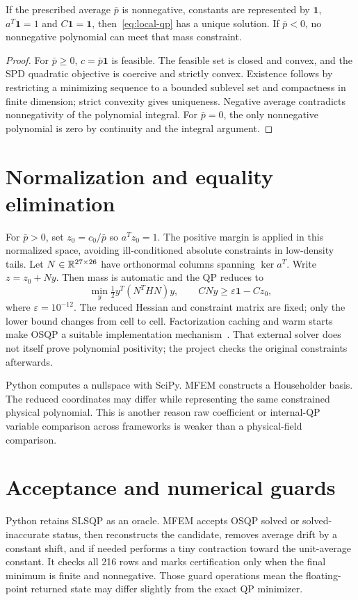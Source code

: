 \begin{proposition}\label{prop:qp}
If the prescribed average $\bar p$ is nonnegative, constants are represented by $\bm1$, $a^T\bm1=1$ and $C\bm1=\bm1$, then~\eqref{eq:local-qp} has a unique solution. If $\bar p<0$, no nonnegative polynomial can meet that mass constraint.
\end{proposition}
\begin{proof}
For $\bar p\ge0$, $c=\bar p\bm1$ is feasible. The feasible set is closed and convex, and the SPD quadratic objective is coercive and strictly convex. Existence follows by restricting a minimizing sequence to a bounded sublevel set and compactness in finite dimension; strict convexity gives uniqueness. Negative average contradicts nonnegativity of the polynomial integral. For $\bar p=0$, the only nonnegative polynomial is zero by continuity and the integral argument.
\end{proof}

\section{Normalization and equality elimination}
For $\bar p>0$, set $z_0=c_0/\bar p$ so $a^Tz_0=1$. The positive margin is applied in this normalized space, avoiding ill-conditioned absolute constraints in low-density tails. Let $N\in\mathbb R^{27\times26}$ have orthonormal columns spanning $\ker a^T$. Write $z=z_0+Ny$. Then mass is automatic and the QP reduces to
\begin{equation}\label{eq:reduced-qp}
\min_y\tfrac12y^T(N^THN)y,\qquad CNy\ge\varepsilon\bm1-Cz_0,
\end{equation}
where $\varepsilon=10^{-12}$. The reduced Hessian and constraint matrix are fixed; only the lower bound changes from cell to cell. Factorization caching and warm starts make OSQP a suitable implementation mechanism~\cite{osqp}. That external solver does not itself prove polynomial positivity; the project checks the original constraints afterwards.

Python computes a nullspace with SciPy. MFEM constructs a Householder basis. The reduced coordinates may differ while representing the same constrained physical polynomial. This is another reason raw coefficient or internal-QP variable comparison across frameworks is weaker than a physical-field comparison.

\section{Acceptance and numerical guards}
Python retains SLSQP as an oracle. MFEM accepts OSQP solved or solved-inaccurate status, then reconstructs the candidate, removes average drift by a constant shift, and if needed performs a tiny contraction toward the unit-average constant. It checks all 216 rows and marks certification only when the final minimum is finite and nonnegative. Those guard operations mean the floating-point returned state may differ slightly from the exact QP minimizer.


